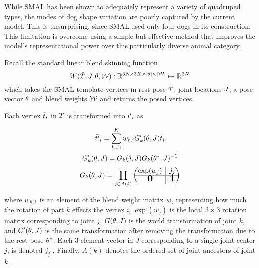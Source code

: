 While SMAL has been shown to adequately represent a variety of quadruped types, the modes of dog shape variation are poorly captured by the current model. This is unsurprising, since SMAL used only four dogs in its construction. This limitation is overcome using a simple but effective method that improves the model's representational power over this particularly diverse animal category. 

Recall the standard linear blend skinning function
\begin{equation}
    W(\bar{T},J,\theta,\mathcal{W}) : \mathbb{R}^{3N \times 3K \times |\theta| \times |\mathcal{W}|} \mapsto {\mathbb{R}^{3N}}
\end{equation}
which takes the SMAL template vertices in rest pose $\bar{T}$, joint locations $J$, a pose vector $\theta$ and blend weights $\mathcal{W}$ and returns the posed vertices.

Each vertex $\bar{t}_{i}$ in $\bar{T}$ is transformed into $\bar{t'}_{i}$ as

\begin{equation}
    \bar{t'}_{i} = \sum_{k=1}^{K} w_{k,i} G_{k}'(\theta,J)\bar{t}_{i}
\end{equation}
\begin{equation}
    G'_{k}(\theta,J) = G_{k}(\theta,J) G_{k}(\theta^{*},J)^{-1}
\end{equation}
\begin{equation}\label{eqt:kintree_prods}
    G_{k}(\pose,\smalrestjts) = \prod_{j \in A(k)} 
    \begin{pmatrix}
        \exp(w_{j})
        & \rvline 
        & j_{j} \\
    \hline
        \bigzero
        & \rvline 
        & \bigone
    \end{pmatrix}
\end{equation}

where $w_{k,i}$ is an element of the blend weight matrix $w$, representing how much the rotation of part $k$ effects the vertex $i$, $\exp(w_{j})$ is the local $3 \times 3$ rotation matrix corresponding to joint $j$, $G(\theta,J)$ is the world transformation of joint $k$, and $G'(\theta,J)$ is the same transformation after removing the transformation due to the rest pose $\theta^{*}$. Each $3$-element vector in $J$ corresponding to a single joint center $j$, is denoted $j_{j}$ . Finally, $A(k)$ denotes the ordered set of joint ancestors of joint $k$.

